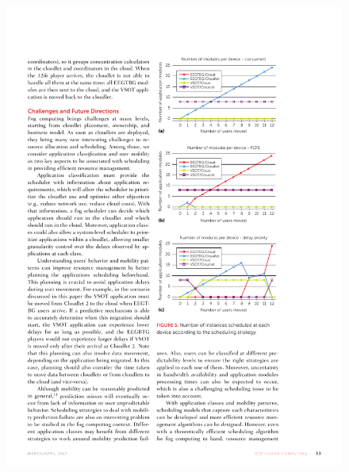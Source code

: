 \documentclass[10pt, pdf, xcolor=pdftex, dvipsnames, table]{beamer}
\begin{document}
\begin{frame}
 	\begin{figure}[htbp]
 		\centerline{\includegraphics[scale=1.2]{images/5a.pdf}}
 		\caption[]{}
 	\end{figure}
\end{frame}
\end{document}
